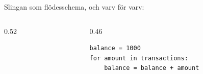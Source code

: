 \documentclass[ignoreframetext]{beamer}
\begin{document}
\begin{frame}[fragile]
  \begin{example}
  Slingan som flödesschema, och varv för varv:
  \begin{columns}[c]
    \begin{column}{0.52\textwidth}
      \figFor
    \end{column}
    \begin{column}{0.46\textwidth}
      \begin{verbatim}
balance = 1000
for amount in transactions:
    balance = balance + amount
      \end{verbatim}
      \medskip
      \footnotesize
      \tabFor
    \end{column}
  \end{columns}
  \end{example}
\end{frame}
\end{document}
